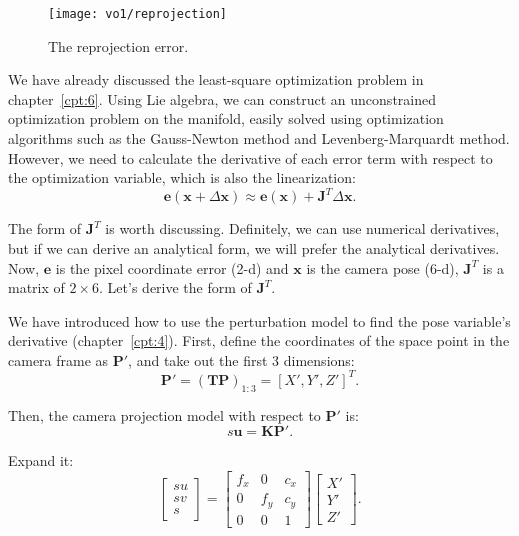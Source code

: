 \begin{figure}[!htp]
	\centering
	\texttt{[image: vo1/reprojection]}
	\caption{The reprojection error.}
	\label{fig:reprojection}
\end{figure}

We have already discussed the least-square optimization problem in chapter~\ref{cpt:6}. Using Lie algebra, we can construct an unconstrained optimization problem on the manifold, easily solved using optimization algorithms such as the Gauss-Newton method and Levenberg-Marquardt method. However, we need to calculate the derivative of each error term with respect to the optimization variable, which is also the linearization:
\begin{equation}
\mathbf{e}( \mathbf{x} + \Delta \mathbf{x} ) \approx \mathbf{e}(\mathbf{x}) + \mathbf{J} ^T\Delta \mathbf{x}.
\end{equation}

The form of $\mathbf{J}^T$ is worth discussing. Definitely, we can use numerical derivatives, but if we can derive an analytical form, we will prefer the analytical derivatives. Now, $\mathbf{e}$ is the pixel coordinate error (2-d) and $\mathbf{x}$ is the camera pose (6-d), $\mathbf{J}^T$ is a matrix of $2 \times 6$. Let's derive the form of $\mathbf{J}^T$.

We have introduced how to use the perturbation model to find the pose variable's derivative (chapter~\ref{cpt:4}). First, define the coordinates of the space point in the camera frame as $\mathbf{P}'$, and take out the first 3 dimensions:
\begin{equation}
\mathbf{P}' = \left( \mathbf{T}{\mathbf{P}} \right)_{1:3}= [X', Y', Z']^T.
\end{equation}

Then, the camera projection model with respect to $\mathbf{P}'$ is:
\begin{equation}
s {\mathbf{u}} = \mathbf{K} \mathbf{P}'.
\end{equation}

Expand it:
\begin{equation}
\left[ \begin{array}{l}
su\\
sv\\
s
\end{array} \right] = \left[ {\begin{array}{*{20}{c}}
	{{f_x}}&0&{{c_x}}\\
	0&{{f_y}}&{{c_y}}\\
	0&0&1
	\end{array}} \right]\left[ \begin{array}{l}
X'\\
Y'\\
Z'
\end{array} \right].
\end{equation}

